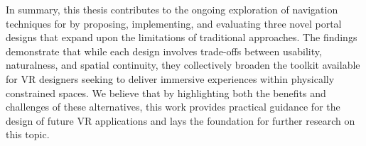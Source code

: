 In summary, this thesis contributes to the ongoing exploration of navigation techniques for  by proposing, 
implementing, and evaluating three novel portal designs that expand upon the limitations of traditional approaches. 
The findings demonstrate that while each design involves trade-offs between usability, naturalness, and spatial continuity, 
they collectively broaden the toolkit available for \gls{VR} designers seeking to deliver immersive experiences within physically 
constrained spaces. We believe that by highlighting both the benefits and challenges of these alternatives, this work provides practical 
guidance for the design of future \gls{VR} applications and lays the foundation for further research on this topic.